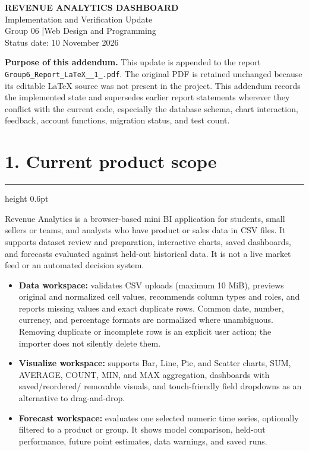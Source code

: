 \documentclass[11pt,a4paper]{article}
\newcommand{\sectiontitle}[1]{%
  \Needspace{5\baselineskip}\vspace{2pt}\section*{\color{brand}#1}\vspace{-5pt}\hrule height 0.6pt\vspace{7pt}
}
\begin{document}
\begin{center}
  {\Large\bfseries\color{brand}REVENUE ANALYTICS DASHBOARD}\\[4pt]
  {\large Implementation and Verification Update}\\[7pt]
  {\color{muted}Group 06 \quad|\quad Web Design and Programming}\\
  {\color{muted}Status date: 10 November 2026}
\end{center}

\vspace{5pt}
\noindent\colorbox{pale}{\parbox{\dimexpr\linewidth-2\fboxsep\relax}{%
\textbf{Purpose of this addendum.} This update is appended to the report
\texttt{Group6\_Report\_LaTeX\_\_1\_.pdf}. The original PDF is retained unchanged
because its editable LaTeX source was not present in the project. This addendum
records the implemented state and supersedes earlier report statements wherever
they conflict with the current code, especially the database schema, chart
interaction, feedback, account functions, migration status, and test count.
}}

\sectiontitle{1. Current product scope}

Revenue Analytics is a browser-based mini BI application for students, small
sellers or teams, and analysts who have product or sales data in CSV files. It
supports dataset review and preparation, interactive charts, saved dashboards,
and forecasts evaluated against held-out historical data. It is not a live
market feed or an automated decision system.

\begin{itemize}
  \item \textbf{Data workspace:} validates CSV uploads (maximum 10 MiB), previews
  original and normalized cell values, recommends column types and roles, and
  reports missing values and exact duplicate rows. Common date, number,
  currency, and percentage formats are normalized where unambiguous. Removing
  duplicate or incomplete rows is an explicit user action; the importer does
  not silently delete them.
  \item \textbf{Visualize workspace:} supports Bar, Line, Pie, and Scatter charts,
  SUM, AVERAGE, COUNT, MIN, and MAX aggregation, dashboards with saved/reordered/
  removable visuals, and touch-friendly field dropdowns as an alternative to
  drag-and-drop.
  \item \textbf{Forecast workspace:} evaluates one selected numeric time series,
  optionally filtered to a product or group. It shows model comparison,
  held-out performance, future point estimates, data warnings, and saved runs.
\end{itemize}
\end{document}
